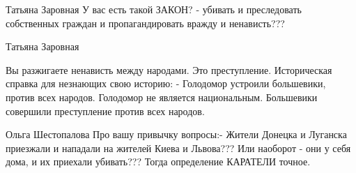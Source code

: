 \begin{itemize}
\begin{itemize}
Татьяна Заровная
У вас есть такой ЗАКОН? - убивать и преследовать собственных граждан и пропагандировать вражду и ненависть???

Татьяна Заровная

Вы разжигаете ненависть между народами. Это преступление. Историческая справка
для незнающих свою историю: - Голодомор устроили большевики, против всех
народов. Голодомор не является национальным. Большевики совершили преступление
против всех народов.


Ольга Шестопалова Про вашу привычку вопросы:- Жители Донецка и Луганска
приезжали и нападали на жителей Киева и Львова??? Или наоборот - они у себя
дома, и их приехали убивать???  Тогда определение КАРАТЕЛИ точное.
\end{itemize}

\end{itemize}
